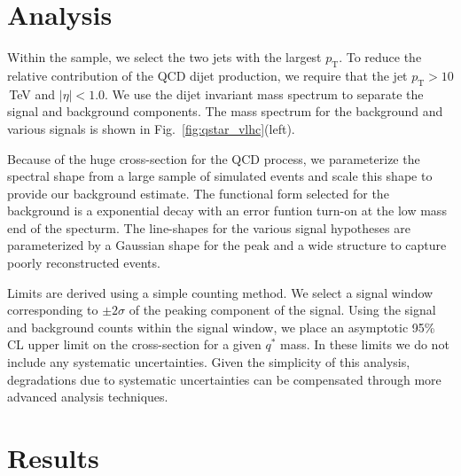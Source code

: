 \section{Analysis}

Within the sample, we select the two jets with the largest
$p_\mathrm{T}$.  To reduce the relative contribution of the QCD dijet
production, we require that the jet $p_\mathrm{T} > 10$\,TeV and $|\eta
| < 1.0$.  We use the dijet invariant mass spectrum to separate the
signal and background components.  The mass spectrum for the
background and various signals is shown in
Fig.~\ref{fig:qstar_vlhc}(left).  

Because of the huge cross-section for the QCD process, we parameterize
the spectral shape from a large sample of simulated events and scale
this shape to provide our background estimate.  The functional form
selected for the background is a exponential decay with an error
funtion turn-on at the low mass end of the specturm.  The line-shapes
for the various signal hypotheses are parameterized by a Gaussian
shape for the peak and a wide structure to capture poorly
reconstructed events.

Limits are derived using a simple counting method.  We select a signal
window corresponding to $\pm 2\sigma$ of the peaking component of the
signal.  Using the signal and background counts within the signal
window, we place an asymptotic 95\% CL upper limit on the
cross-section for a given $q^*$ mass.  In these limits we do not
include any systematic uncertainties.  Given the simplicity of this
analysis, degradations due to systematic uncertainties can be
compensated through more advanced analysis techniques.

\section{Results}

